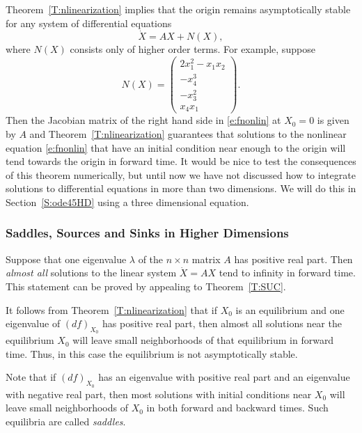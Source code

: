 \documentclass{ximera}
\begin{document}
Theorem~\ref{T:nlinearization} implies that the origin remains
asymptotically stable for any system of differential equations
\begin{equation} \label{e:fnonlin}
\dot{X} = AX + N(X),
\end{equation}
where $N(X)$ consists only of higher order terms.  For example, suppose
\begin{equation}  \label{E:fnonlin1}
N(X) = \left(\begin{array}{c} 2x_1^2-x_1x_2 \\ -x_4^3 \\  -x_3^2 \\ x_4x_1
\end{array} \right).
\end{equation}
Then the Jacobian matrix of the right hand side in \eqref{e:fnonlin} at $X_0 = 0$ 
is given by $A$ and Theorem~\ref{T:nlinearization} guarantees that solutions to 
the nonlinear equation \eqref{e:fnonlin} that have an initial condition near 
enough to the origin will tend towards the origin in forward time.  It would be 
nice to test the consequences of this theorem numerically, but until now we
have not discussed how to integrate solutions to differential equations in
more than two dimensions.  We will do this in Section~\ref{S:ode45HD} using a 
three dimensional equation. 

\subsubsection*{Saddles, Sources and Sinks in Higher Dimensions}

Suppose that one eigenvalue $\lambda$ of the $n\times n$ matrix $A$ has 
positive real part.  Then {\em almost all\/} solutions to the linear system 
$\dot{X}=AX$ tend to infinity in forward time.  This 
statement can be proved by appealing to Theorem~\ref{T:SUC}.    

It follows from Theorem~\ref{T:nlinearization} that if $X_0$ is an
equilibrium and one eigenvalue of $(df)_{X_0}$ has positive 
real part, then almost all solutions near the equilibrium $X_0$ will leave 
small neighborhoods of that equilibrium in forward time.  Thus, in this case 
the equilibrium is not asymptotically stable.

Note that if $(df)_{X_0}$ has an eigenvalue with positive real part and an
eigenvalue with negative real part, then most solutions with initial
conditions near $X_0$ will leave small neighborhoods of $X_0$ in both forward
and backward times.  Such equilibria are called {\em saddles\/}.
\end{document}
